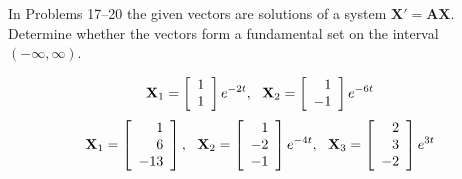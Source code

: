 \documentclass[chapter=8,section=1]{math252homework}
\begin{document}
In Problems 17--20 the given vectors are solutions of a system $\mathbf{X'}=\mathbf{AX}$.
Determine whether the vectors form a fundamental set on the interval $(-\infty, \infty)$.
\begin{problems}[start=17]
	\problem \[ \mathbf{X}_{1} = \left[ \begin{array}{c}
		1\\
		1
	\end{array} \right]e^{-2t},\mbox{{ }{ }} \mathbf{X}_{2} = \left[ \begin{array}{r}
		1\\
		-1
	\end{array} \right]e^{-6t} \]			%
	\setcounter{problemsi}{19}
	\problem \[ \mathbf{X}_{1} = \left[ \begin{array}{r}
		1\\
		6\\
		-13
	\end{array} \right],\mbox{{ }{ }} \mathbf{X}_{2} = \left[ \begin{array}{r}
		1\\
		-2\\
		-1
	\end{array} \right]e^{-4t},\mbox{{ }{ }} \mathbf{X}_{3} = \left[ \begin{array}{r}
		2\\
		3\\
		-2
	\end{array} \right]e^{3t} \]			%
\end{problems}
\end{document}
